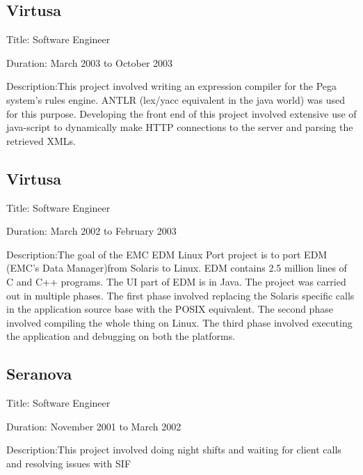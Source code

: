 \documentclass [a4paper,11pt] {article}
\begin{document}
\subsection*{Virtusa}
\begin{description}
\item{Title:} Software Engineer
\item{Duration:} March 2003 to October 2003
\item{Description:}This project involved writing an expression compiler for the Pega system's rules engine. ANTLR (lex/yacc equivalent in the java world) was used for this purpose.  Developing the front end of this project involved extensive use of java-script to dynamically make HTTP connections to the server and parsing the retrieved XMLs.
\end{description}


\subsection*{Virtusa}
\begin{description}
\item{Title:} Software Engineer
\item{Duration:} March 2002 to February 2003
\item{Description:}The goal of the EMC EDM Linux Port project is to port EDM (EMC's Data Manager)from Solaris to Linux. EDM contains 2.5 million lines of C and C++ programs. The UI part of EDM is in Java.  The project was carried out in multiple phases. The first phase involved replacing the Solaris specific calls in the application source base with the POSIX equivalent. The second phase involved compiling the whole thing on Linux. The third phase involved executing the application and debugging on both the platforms.
\end{description}

\subsection*{Seranova}
\begin{description}
\item{Title:} Software Engineer
\item{Duration:} November 2001 to March 2002
\item{Description:}This project involved doing night shifts and waiting for client calls and resolving issues with SIF
\end{description}
\end{document}
